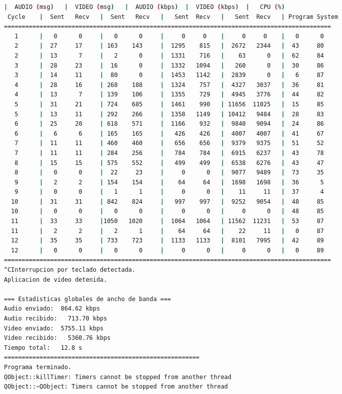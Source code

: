 \begin{adjustbox}{max width=\textwidth}
\begin{lstlisting}[language=bash,basicstyle=\ttfamily\scriptsize]
          |  AUDIO (msg)   |  VIDEO (msg)   |  AUDIO (kbps)  |  VIDEO (kbps)  |   CPU (%)
 Cycle    |  Sent   Recv   |  Sent   Recv   |   Sent  Recv   |   Sent  Recv   | Program System
============================================================================================
   1      |   0      0     |   0      0     |     0     0    |     0     0    |   0      0
   2      |  27     17     | 163    143     |  1295    815   |  2672   2344   |  43     80
   2      |  13      7     |   2      0     |  1331    716   |    63      0   |  62     84
   3      |  28     23     |  16      0     |  1332   1094   |   260      0   |  30     86
   3      |  14     11     |  80      0     |  1453   1142   |  2839      0   |   6     87
   4      |  28     16     | 268    188     |  1324    757   |  4327   3037   |  36     81
   4      |  13      7     | 139    106     |  1355    729   |  4945   3776   |  44     82
   5      |  31     21     | 724    685     |  1461    990   | 11656  11025   |  15     85
   5      |  13     11     | 292    266     |  1358   1149   | 10412   9484   |  28     83
   6      |  25     20     | 618    571     |  1166    932   |  9840   9094   |  24     86
   6      |   6      6     | 165    165     |   426    426   |  4007   4007   |  41     67
   7      |  11     11     | 460    460     |   656    656   |  9379   9375   |  51     52
   7      |  11     11     | 284    256     |   784    784   |  6915   6237   |  43     78
   8      |  15     15     | 575    552     |   499    499   |  6538   6276   |  43     47
   8      |   0      0     |  22     23     |     0      0   |  9077   9489   |  73     35
   9      |   2      2     | 154    154     |    64     64   |  1698   1698   |  36      5
   9      |   0      0     |   1      1     |     0      0   |    11     11   |  37      4
  10      |  31     31     | 842    824     |   997    997   |  9252   9054   |  48     85
  10      |   0      0     |   0      0     |     0      0   |     0      0   |  48     85
  11      |  33     33     |1050   1020     |  1064   1064   | 11562  11231   |  53     87
  11      |   2      2     |   2      1     |    64     64   |    22     11   |   0     87
  12      |  35     35     | 733    723     |  1133   1133   |  8101   7995   |  42     89
  12      |   0      0     |   0      0     |     0      0   |     0      0   |   0     89
============================================================================================
^CInterrupcion por teclado detectada.
Aplicacion de video detenida.

=== Estadisticas globales de ancho de banda ===
Audio enviado:	864.62 kbps
Audio recibido:   713.70 kbps
Video enviado:	5755.11 kbps
Video recibido:   5360.76 kbps
Tiempo total: 	12.8 s
=======================================================
Programa terminado.
QObject::killTimer: Timers cannot be stopped from another thread
QObject::~QObject: Timers cannot be stopped from another thread
\end{lstlisting}
\end{adjustbox}
\vspace{\baselineskip}

